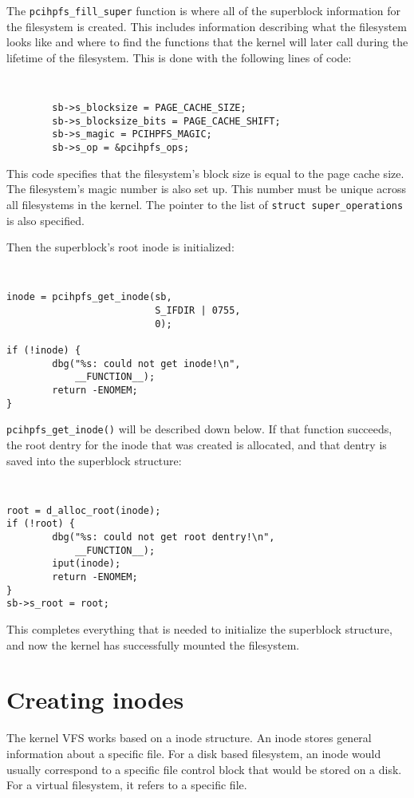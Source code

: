 \documentclass[twocolumn]{article}
\begin{document}
The {\tt pcihpfs\_fill\_super} function is where all of the superblock
information for the filesystem is created.  This includes information
describing what the filesystem looks like and where to find the functions
that the kernel will later call during the lifetime of the filesystem.
This is done with the following lines of code:
{\tt \small
\begin{verbatim}
        sb->s_blocksize = PAGE_CACHE_SIZE;
        sb->s_blocksize_bits = PAGE_CACHE_SHIFT;
        sb->s_magic = PCIHPFS_MAGIC;
        sb->s_op = &pcihpfs_ops;
\end{verbatim}
}
This code specifies that the filesystem's block size is equal to the page
cache size.  The filesystem's magic number is also set up.  This number
must be unique across all filesystems in the kernel.  The pointer to the
list of {\tt struct super\_operations} is also specified.

Then the superblock's root inode is initialized:
{\tt \small
\begin{verbatim}
inode = pcihpfs_get_inode(sb,
                          S_IFDIR | 0755,
                          0);

if (!inode) {
        dbg("%s: could not get inode!\n",
            __FUNCTION__);
        return -ENOMEM;
}
\end{verbatim}
}
{\tt pcihpfs\_get\_inode()} will be described down below.  If that function
succeeds, the root dentry for the inode that was created is allocated, and
that dentry is saved into the superblock structure:
{\tt \small
\begin{verbatim}
root = d_alloc_root(inode);
if (!root) {
        dbg("%s: could not get root dentry!\n",
            __FUNCTION__);
        iput(inode);
        return -ENOMEM;
}
sb->s_root = root;
\end{verbatim}
}

This completes everything that is needed to initialize the superblock
structure, and now the kernel has successfully mounted the filesystem.


\section{Creating inodes}

The kernel VFS works based on a inode structure.  An inode stores general
information about a specific file.  For a disk based filesystem, an inode
would usually correspond to a specific file control block that would be
stored on a disk.  For a virtual filesystem, it refers to a specific file.
\end{document}

